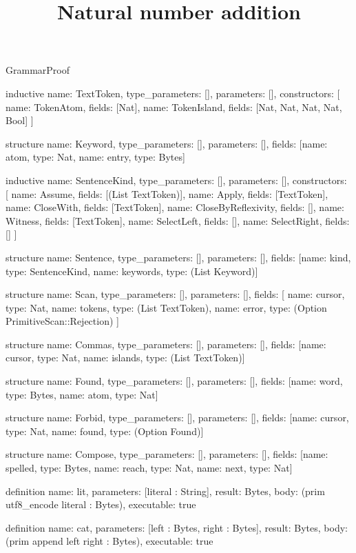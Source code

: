 \begin{lexlean}{GrammarProof}
\title{Natural number addition}
\begin{semanticmodule}
inductive{
  name: TextToken,
  type_parameters: [],
  parameters: [],
  constructors: [
    {name: TokenAtom, fields: [Nat]},
    {name: TokenIsland, fields: [Nat, Nat, Nat, Nat, Bool]}
  ]
}

structure{
  name: Keyword,
  type_parameters: [],
  parameters: [],
  fields: [{name: atom, type: Nat}, {name: entry, type: Bytes}]
}

inductive{
  name: SentenceKind,
  type_parameters: [],
  parameters: [],
  constructors: [
    {name: Assume, fields: [(List TextToken)]},
    {name: Apply, fields: [TextToken]},
    {name: CloseWith, fields: [TextToken]},
    {name: CloseByReflexivity, fields: []},
    {name: Witness, fields: [TextToken]},
    {name: SelectLeft, fields: []},
    {name: SelectRight, fields: []}
  ]
}

structure{
  name: Sentence,
  type_parameters: [],
  parameters: [],
  fields: [{name: kind, type: SentenceKind}, {name: keywords, type: (List Keyword)}]
}

structure{
  name: Scan,
  type_parameters: [],
  parameters: [],
  fields: [
    {name: cursor, type: Nat},
    {name: tokens, type: (List TextToken)},
    {name: error, type: (Option PrimitiveScan::Rejection)}
  ]
}

structure{
  name: Commas,
  type_parameters: [],
  parameters: [],
  fields: [{name: cursor, type: Nat}, {name: islands, type: (List TextToken)}]
}

structure{
  name: Found,
  type_parameters: [],
  parameters: [],
  fields: [{name: word, type: Bytes}, {name: atom, type: Nat}]
}

structure{
  name: Forbid,
  type_parameters: [],
  parameters: [],
  fields: [{name: cursor, type: Nat}, {name: found, type: (Option Found)}]
}

structure{
  name: Compose,
  type_parameters: [],
  parameters: [],
  fields: [{name: spelled, type: Bytes}, {name: reach, type: Nat}, {name: next, type: Nat}]
}

definition{
  name: lit,
  parameters: [literal : String],
  result: Bytes,
  body: (prim utf8_encode literal : Bytes),
  executable: true
}

definition{
  name: cat,
  parameters: [left : Bytes, right : Bytes],
  result: Bytes,
  body: (prim append left right : Bytes),
  executable: true
}


\end{semanticmodule}
\end{lexlean}
